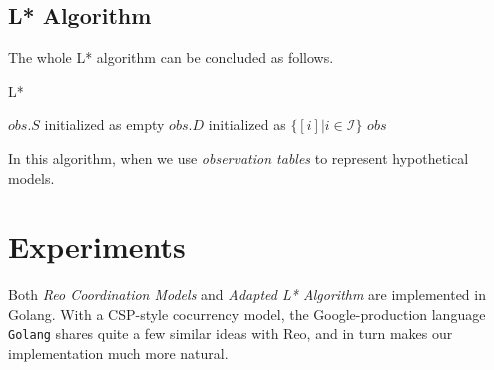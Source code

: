 \documentclass[conference, a4paper]{IEEEtran}
\newtheorem{definition}{Definition}
\begin{document}




\subsection{L* Algorithm}
The whole L* algorithm can be concluded as follows.
\begin{algorithm} 
  \caption{L*} 
  \label{alg:lstar}
  $obs.S$ initialized as empty\;
  $obs.D$ initialized as $\{[i]|i\in\mathcal{I}\}$\;
  \Return $obs$\; 
\end{algorithm}

In this algorithm, when we use \emph{observation tables} to represent hypothetical models. 


\section{Experiments}  
\label{sec:experiment}

Both \emph{Reo Coordination Models} and \emph{Adapted L* Algorithm} are implemented in
Golang. With a CSP-style\cite{DBLP:books/ph/Hoare85} cocurrency model, the Google-production language
\texttt{Golang} shares quite a few similar ideas with Reo, and in turn makes our implementation much
more natural.
\end{document}
